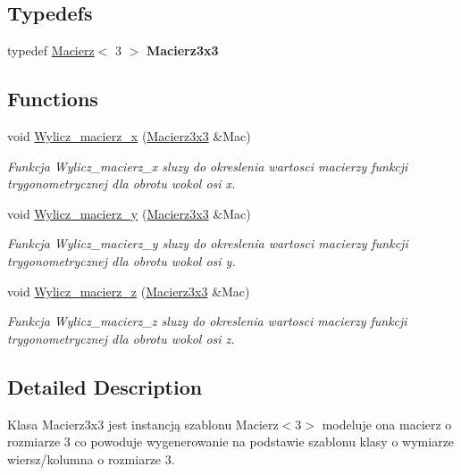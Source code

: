 \subsection*{Typedefs}
\begin{DoxyCompactItemize}
\item 
\mbox{\label{Macierz3x3_8hh_ad4fc7b0e263d9a99ba6174f68b52ea87}} 
typedef \hyperlink{classMacierz}{Macierz}$<$ 3 $>$ {\bfseries Macierz3x3}
\end{DoxyCompactItemize}
\subsection*{Functions}
\begin{DoxyCompactItemize}
\item 
void \hyperlink{Macierz3x3_8hh_a28670d7aba1ee76534fe5762b3b747b6}{Wylicz\+\_\+macierz\+\_\+x} (\hyperlink{classMacierz}{Macierz3x3} \&Mac)
\begin{DoxyCompactList}\small\item\em Funkcja Wylicz\+\_\+macierz\+\_\+x sluzy do okreslenia wartosci macierzy funkcji trygonometrycznej dla obrotu wokol osi x. \end{DoxyCompactList}\item 
void \hyperlink{Macierz3x3_8hh_aaf1ca1069eac4e0e1d9b093a31ea5003}{Wylicz\+\_\+macierz\+\_\+y} (\hyperlink{classMacierz}{Macierz3x3} \&Mac)
\begin{DoxyCompactList}\small\item\em Funkcja Wylicz\+\_\+macierz\+\_\+y sluzy do okreslenia wartosci macierzy funkcji trygonometrycznej dla obrotu wokol osi y. \end{DoxyCompactList}\item 
void \hyperlink{Macierz3x3_8hh_ab551a0498128eb4b007c4243e9840a40}{Wylicz\+\_\+macierz\+\_\+z} (\hyperlink{classMacierz}{Macierz3x3} \&Mac)
\begin{DoxyCompactList}\small\item\em Funkcja Wylicz\+\_\+macierz\+\_\+z sluzy do okreslenia wartosci macierzy funkcji trygonometrycznej dla obrotu wokol osi z. \end{DoxyCompactList}\end{DoxyCompactItemize}


\subsection{Detailed Description}
Klasa Macierz3x3 jest instancją szablonu Macierz$<$3$>$ modeluje ona macierz o rozmiarze 3 co powoduje wygenerowanie na podstawie szablonu klasy o wymiarze wiersz/kolumna o rozmiarze 3. 



